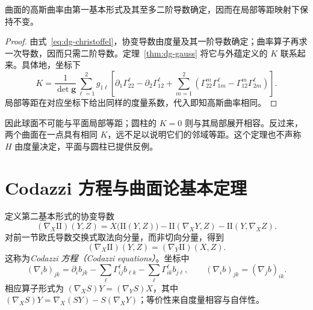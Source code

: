 \begin{theorem}
曲面的高斯曲率由第一基本形式及其至多二阶导数确定，因而在局部等距映射下保持不变。
\label{thm:dg-egregium}
\end{theorem}
\begin{proof}
由式~\eqref{eq:dg-christoffel}，协变导数由度量及其一阶导数确定；曲率算子再求一次导数，因而只需二阶导数。定理~\ref{thm:dg-gauss} 将它与外蕴定义的 $K$ 联系起来。具体地，坐标下
\begin{equation}
 K=\frac{1}{\det\mathbf g}\sum_{\ell=1}^2 g_{1\ell}
 \left[\partial_1\Gamma^\ell_{22}-\partial_2\Gamma^\ell_{12}
 +\sum_{m=1}^2\left(\Gamma^m_{22}\Gamma^\ell_{1m}
 -\Gamma^m_{12}\Gamma^\ell_{2m}\right)\right].
 \label{eq:dg-K-christoffel}
\end{equation}
局部等距在对应坐标下给出同样的度量系数，代入即知高斯曲率相同。
\end{proof}
因此球面不可能与平面局部等距；圆柱的 $K=0$ 则与其局部展开相容。反过来，两个曲面在一点具有相同 $K$，远不足以说明它们的邻域等距。这个定理也不声称 $H$ 由度量决定，平面与圆柱已提供反例。

\section{Codazzi 方程与曲面论基本定理}
定义第二基本形式的协变导数
\[
 (\nabla_X\mathrm{II})(Y,Z)=X\bigl(\mathrm{II}(Y,Z)\bigr)
 -\mathrm{II}(\nabla_XY,Z)-\mathrm{II}(Y,\nabla_XZ).
\]
对前一节欧氏导数交换式取法向分量，而非切向分量，得到
\begin{equation}
 (\nabla_X\mathrm{II})(Y,Z)=(\nabla_Y\mathrm{II})(X,Z).
 \label{eq:dg-codazzi}
\end{equation}
这称为\emph{Codazzi 方程（Codazzi equations）}。坐标中
\[
 (\nabla_i b)_{jk}=\partial_i b_{jk}
 -\sum_\ell\Gamma^\ell_{ij}b_{\ell k}
 -\sum_\ell\Gamma^\ell_{ik}b_{j\ell},\qquad
 (\nabla_i b)_{jk}=(\nabla_j b)_{ik}.
\]
相应算子形式为 $(\nabla_XS)Y=(\nabla_YS)X$，其中 $(\nabla_XS)Y=\nabla_X(SY)-S(\nabla_XY)$；等价性来自度量相容与自伴性。

